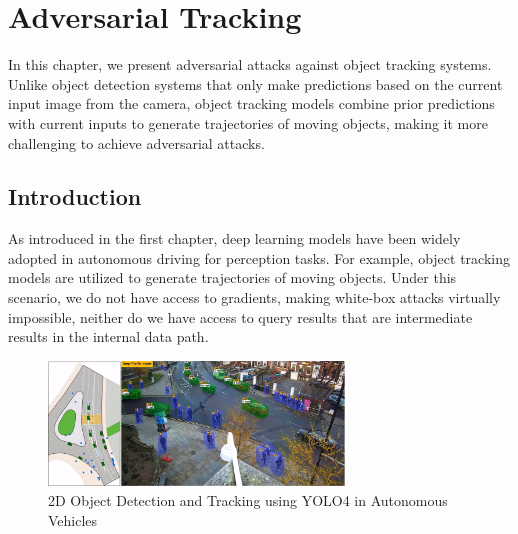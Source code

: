 \chapter{Adversarial Tracking}
\label{chpt:tracking}


In this chapter, we present adversarial attacks against object tracking systems. Unlike object detection systems that only make predictions based on the current input image from the camera, object tracking models combine prior predictions with current inputs to generate trajectories of moving objects, making it more challenging to achieve adversarial attacks.

\section{Introduction}
\label{sec:adv_track}

As introduced in the first chapter, deep learning models have been widely adopted in autonomous driving for perception tasks. For example, object tracking models are utilized to generate trajectories of moving objects. Under this scenario, we do not have access to gradients, making white-box attacks virtually impossible, neither do we have access to query results that are intermediate results in the internal data path.

\begin{figure}[b]
\centering
\includegraphics[width=0.7\textwidth]{figures/chapter_tracking/tracking.jpg}
\caption{2D Object Detection and Tracking using YOLO4 in Autonomous Vehicles}
\label{fig.tracking}
\end{figure}


